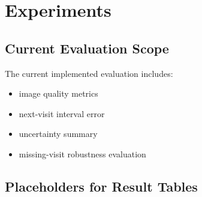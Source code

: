 \section{Experiments}

\subsection{Current Evaluation Scope}

The current implemented evaluation includes:
\begin{itemize}[leftmargin=1.5em]
  \item image quality metrics
  \item next-visit interval error
  \item uncertainty summary
  \item missing-visit robustness evaluation
\end{itemize}

\subsection{Placeholders for Result Tables}





